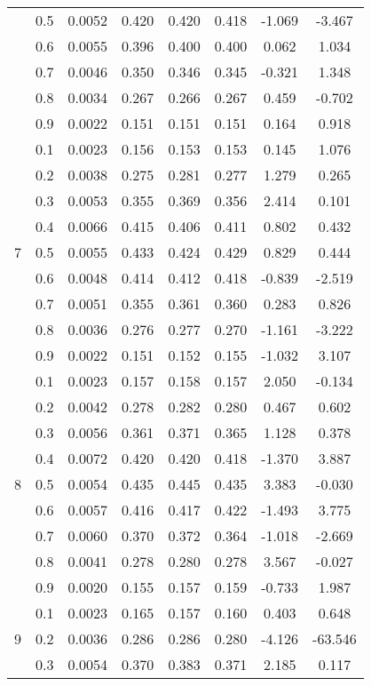 \documentclass[11pt,a4paper]{report}
\begin{document}
\begin{longtable}{ | c | c || c | c | c | c | c | c | }
 & 0.5 & 0.0052 & 0.420 & 0.420 & 0.418 & -1.069 & -3.467 \\
 & 0.6 & 0.0055 & 0.396 & 0.400 & 0.400 & 0.062 & 1.034 \\
 & 0.7 & 0.0046 & 0.350 & 0.346 & 0.345 & -0.321 & 1.348 \\
 & 0.8 & 0.0034 & 0.267 & 0.266 & 0.267 & 0.459 & -0.702 \\
 & 0.9 & 0.0022 & 0.151 & 0.151 & 0.151 & 0.164 & 0.918 \\
 \hline
\multirow{9}{*}{7} & 0.1 & 0.0023 & 0.156 & 0.153 & 0.153 & 0.145 & 1.076 \\
 & 0.2 & 0.0038 & 0.275 & 0.281 & 0.277 & 1.279 & 0.265 \\
 & 0.3 & 0.0053 & 0.355 & 0.369 & 0.356 & 2.414 & 0.101 \\
 & 0.4 & 0.0066 & 0.415 & 0.406 & 0.411 & 0.802 & 0.432 \\
 & 0.5 & 0.0055 & 0.433 & 0.424 & 0.429 & 0.829 & 0.444 \\
 & 0.6 & 0.0048 & 0.414 & 0.412 & 0.418 & -0.839 & -2.519 \\
 & 0.7 & 0.0051 & 0.355 & 0.361 & 0.360 & 0.283 & 0.826 \\
 & 0.8 & 0.0036 & 0.276 & 0.277 & 0.270 & -1.161 & -3.222 \\
 & 0.9 & 0.0022 & 0.151 & 0.152 & 0.155 & -1.032 & 3.107 \\
 \hline
\multirow{9}{*}{8} & 0.1 & 0.0023 & 0.157 & 0.158 & 0.157 & 2.050 & -0.134 \\
 & 0.2 & 0.0042 & 0.278 & 0.282 & 0.280 & 0.467 & 0.602 \\
 & 0.3 & 0.0056 & 0.361 & 0.371 & 0.365 & 1.128 & 0.378 \\
 & 0.4 & 0.0072 & 0.420 & 0.420 & 0.418 & -1.370 & 3.887 \\
 & 0.5 & 0.0054 & 0.435 & 0.445 & 0.435 & 3.383 & -0.030 \\
 & 0.6 & 0.0057 & 0.416 & 0.417 & 0.422 & -1.493 & 3.775 \\
 & 0.7 & 0.0060 & 0.370 & 0.372 & 0.364 & -1.018 & -2.669 \\
 & 0.8 & 0.0041 & 0.278 & 0.280 & 0.278 & 3.567 & -0.027 \\
 & 0.9 & 0.0020 & 0.155 & 0.157 & 0.159 & -0.733 & 1.987 \\
 \hline
\multirow{9}{*}{9} & 0.1 & 0.0023 & 0.165 & 0.157 & 0.160 & 0.403 & 0.648 \\
 & 0.2 & 0.0036 & 0.286 & 0.286 & 0.280 & -4.126 & -63.546 \\
 & 0.3 & 0.0054 & 0.370 & 0.383 & 0.371 & 2.185 & 0.117 \\

\end{longtable}
\end{document}
